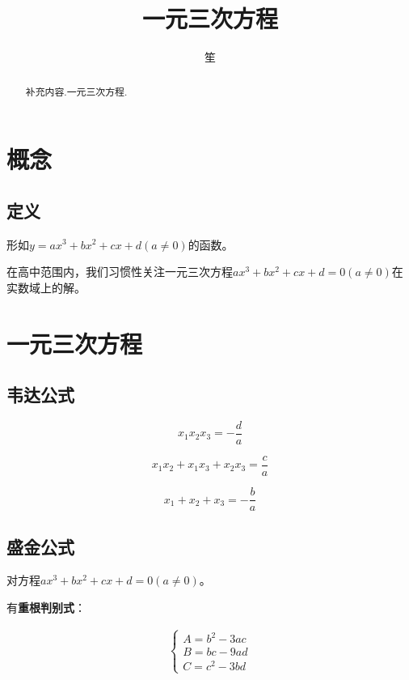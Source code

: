 \documentclass{ctexart}
\title{一元三次方程}
\author{笙}
\begin{document}
\tableofcontents
\maketitle


\begin{abstract}
补充内容.一元三次方程.
\end{abstract}

\section{概念}

\subsection{定义}

形如$y=ax^3+bx^2+cx+d (a\neq 0)$的函数。

在高中范围内，我们习惯性关注一元三次方程$ax^3+bx^2+cx+d=0(a\neq 0)$在实数域上的解。

\section{一元三次方程}

\subsection{韦达公式}

\begin{equation}
    x_1x_2x_3=-\frac{d}{a}
\end{equation}

\begin{equation}
    x_1x_2+x_1x_3+x_2x_3=\frac{c}{a}
\end{equation}

\begin{equation}
    x_1+x_2+x_3=-\frac{b}{a}
\end{equation}


\subsection{盛金公式}

对方程\textbf{$ax^3+bx^2+cx+d=0(a\neq 0)$}。

\bigskip

有\textbf{重根判别式}：

\begin{align}
    \begin{cases}
        A=b^2-3ac\\
        B=bc-9ad\\
        C=c^2-3bd
    \end{cases}    
\end{align}
\end{document}
